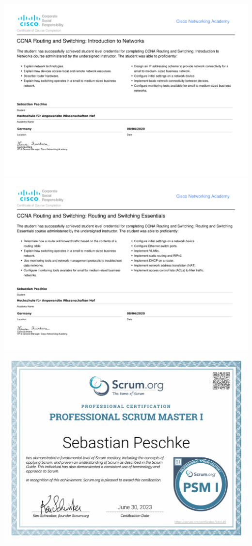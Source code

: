 \documentclass[
    10pt, %
]{FreemanCV}
\begin{document}
    \begin{landscape}
        \includegraphics[scale=0.8]{./assets/SebastianPeschke-HOF_2020_I2N_HEY-certificate}
        \newpage
        \includegraphics[scale=0.8]{./assets/SebastianPeschke-HOF_2020_RSE_HEY-certificate}
        \newpage
        \includegraphics[scale=0.8]{./assets/Professional Scrum Master I}
    \end{landscape}
\end{document}
